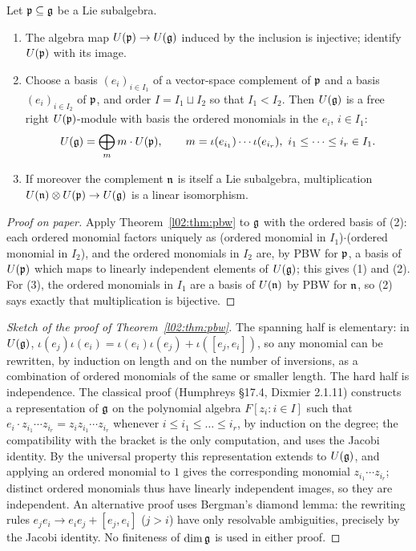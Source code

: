 \begin{corollary}\label{l02:cor:free}
Let $\mathfrak{p}\subseteq\mathfrak{g}$ be a Lie subalgebra.
\begin{enumerate}
\item The algebra map $U(\mathfrak{p})\to U(\mathfrak{g})$ induced by the inclusion is injective; identify
  $U(\mathfrak{p})$ with its image.
\item Choose a basis $(e_i)_{i\in I_1}$ of a vector-space complement of $\mathfrak{p}$ and a basis
  $(e_i)_{i\in I_2}$ of $\mathfrak{p}$, and order $I = I_1\sqcup I_2$ so that $I_1 < I_2$. Then $U(\mathfrak{g})$ is a
  free right $U(\mathfrak{p})$-module with basis the ordered monomials in the $e_i$, $i\in I_1$:
  \begin{equation*}
   U(\mathfrak{g}) = \bigoplus_{m} m\cdot U(\mathfrak{p}),\qquad m = \iota(e_{i_1})\cdots\iota(e_{i_r}),\ i_1\le\dots\le i_r\in I_1.
  \end{equation*}
\item If moreover the complement $\mathfrak{n}$ is itself a Lie subalgebra, multiplication
  $U(\mathfrak{n})\otimes U(\mathfrak{p})\to U(\mathfrak{g})$ is a linear isomorphism.
\end{enumerate}
\end{corollary}

\begin{proof}[Proof on paper]
Apply Theorem~\ref{l02:thm:pbw} to $\mathfrak{g}$ with the ordered basis of (2): each ordered monomial
factors uniquely as (ordered monomial in $I_1$)$\cdot$(ordered monomial in $I_2$), and the
ordered monomials in $I_2$ are, by PBW for $\mathfrak{p}$, a basis of $U(\mathfrak{p})$ which maps to linearly
independent elements of $U(\mathfrak{g})$; this gives (1) and (2). For (3), the ordered monomials in $I_1$
are a basis of $U(\mathfrak{n})$ by PBW for $\mathfrak{n}$, so (2) says exactly that multiplication is
bijective.
\end{proof}

\begin{proof}[Sketch of the proof of Theorem~\ref{l02:thm:pbw}]
The spanning half is elementary: in $U(\mathfrak{g})$, $\iota(e_j)\iota(e_i) = \iota(e_i)\iota(e_j) +
\iota([e_j,e_i])$, so any monomial can be rewritten, by induction on length and on the number of
inversions, as a combination of ordered monomials of the same or smaller length. The hard half is
independence. The classical proof (Humphreys \S17.4, Dixmier 2.1.11) constructs a representation of
$\mathfrak{g}$ on the polynomial algebra $F[z_i : i\in I]$ such that $e_i\cdot z_{i_1}\cdots z_{i_r} =
z_iz_{i_1}\cdots z_{i_r}$ whenever $i\le i_1\le\dots\le i_r$, by induction on the degree; the
compatibility with the bracket is the only computation, and uses the Jacobi identity. By the
universal property this representation extends to $U(\mathfrak{g})$, and applying an ordered monomial to
$1$ gives the corresponding monomial $z_{i_1}\cdots z_{i_r}$; distinct ordered monomials thus have
linearly independent images, so they are independent. An alternative proof uses Bergman's diamond
lemma: the rewriting rules $e_je_i\to e_ie_j + [e_j,e_i]$ ($j>i$) have only resolvable ambiguities,
precisely by the Jacobi identity. No finiteness of $\dim\mathfrak{g}$ is used in either proof.
\end{proof}

